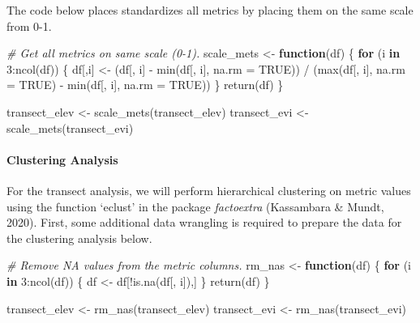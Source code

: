 \documentclass[
]{article}
\newenvironment{Shaded}{\begin{snugshade}}{\end{snugshade}}
\newcommand{\AttributeTok}[1]{\textcolor[rgb]{0.77,0.63,0.00}{#1}}
\newcommand{\CommentTok}[1]{\textcolor[rgb]{0.56,0.35,0.01}{\textit{#1}}}
\newcommand{\ConstantTok}[1]{\textcolor[rgb]{0.00,0.00,0.00}{#1}}
\newcommand{\ControlFlowTok}[1]{\textcolor[rgb]{0.13,0.29,0.53}{\textbf{#1}}}
\newcommand{\DecValTok}[1]{\textcolor[rgb]{0.00,0.00,0.81}{#1}}
\newcommand{\FunctionTok}[1]{\textcolor[rgb]{0.00,0.00,0.00}{#1}}
\newcommand{\NormalTok}[1]{#1}
\newcommand{\OtherTok}[1]{\textcolor[rgb]{0.56,0.35,0.01}{#1}}
\newcommand{\SpecialCharTok}[1]{\textcolor[rgb]{0.00,0.00,0.00}{#1}}
\begin{document}
The code below places standardizes all metrics by placing them on the
same scale from 0-1.

\begin{Shaded}
\begin{Highlighting}[]
\CommentTok{\# Get all metrics on same scale (0{-}1).}
\NormalTok{scale\_mets }\OtherTok{\textless{}{-}} \ControlFlowTok{function}\NormalTok{(df) \{}
  \ControlFlowTok{for}\NormalTok{ (i }\ControlFlowTok{in} \DecValTok{3}\SpecialCharTok{:}\FunctionTok{ncol}\NormalTok{(df)) \{}
\NormalTok{     df[,i] }\OtherTok{\textless{}{-}}\NormalTok{ (df[, i] }\SpecialCharTok{{-}} \FunctionTok{min}\NormalTok{(df[, i], }\AttributeTok{na.rm =} \ConstantTok{TRUE}\NormalTok{)) }\SpecialCharTok{/} 
\NormalTok{       (}\FunctionTok{max}\NormalTok{(df[, i], }\AttributeTok{na.rm =} \ConstantTok{TRUE}\NormalTok{) }\SpecialCharTok{{-}} \FunctionTok{min}\NormalTok{(df[, i], }\AttributeTok{na.rm =} \ConstantTok{TRUE}\NormalTok{))}
\NormalTok{  \}}
  \FunctionTok{return}\NormalTok{(df)}
\NormalTok{\}}

\NormalTok{transect\_elev }\OtherTok{\textless{}{-}} \FunctionTok{scale\_mets}\NormalTok{(transect\_elev)}
\NormalTok{transect\_evi }\OtherTok{\textless{}{-}} \FunctionTok{scale\_mets}\NormalTok{(transect\_evi)}
\end{Highlighting}
\end{Shaded}

\hypertarget{clustering-analysis}{%
\paragraph{Clustering Analysis}\label{clustering-analysis}}

For the transect analysis, we will perform hierarchical clustering on
metric values using the function `eclust' in the package
\emph{factoextra} (Kassambara \& Mundt, 2020). First, some additional
data wrangling is required to prepare the data for the clustering
analysis below.

\begin{Shaded}
\begin{Highlighting}[]

\CommentTok{\# Remove NA values from the metric columns.}
\NormalTok{rm\_nas }\OtherTok{\textless{}{-}} \ControlFlowTok{function}\NormalTok{(df) \{}
  \ControlFlowTok{for}\NormalTok{ (i }\ControlFlowTok{in} \DecValTok{3}\SpecialCharTok{:}\FunctionTok{ncol}\NormalTok{(df)) \{}
\NormalTok{    df }\OtherTok{\textless{}{-}}\NormalTok{ df[}\SpecialCharTok{!}\FunctionTok{is.na}\NormalTok{(df[, i]),]}
\NormalTok{  \}}
  \FunctionTok{return}\NormalTok{(df)}
\NormalTok{\}}

\NormalTok{transect\_elev }\OtherTok{\textless{}{-}} \FunctionTok{rm\_nas}\NormalTok{(transect\_elev)}
\NormalTok{transect\_evi }\OtherTok{\textless{}{-}} \FunctionTok{rm\_nas}\NormalTok{(transect\_evi)}
\end{Highlighting}
\end{Shaded}
\end{document}
